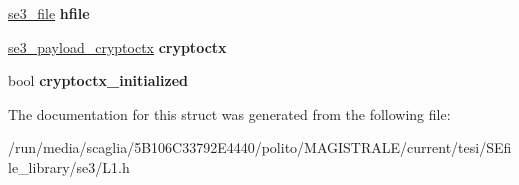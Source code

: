 \begin{DoxyCompactItemize}
\item 
\hypertarget{structse3__session___a9ed3dacbd53aad1de2b90e9da5aeea1b}{\hyperlink{structse3__file}{se3\-\_\-file} {\bfseries hfile}}\label{structse3__session___a9ed3dacbd53aad1de2b90e9da5aeea1b}

\item 
\hypertarget{structse3__session___af51decff75d32eff75f3b657fca10cab}{\hyperlink{structse3__payload__cryptoctx__}{se3\-\_\-payload\-\_\-cryptoctx} {\bfseries cryptoctx}}\label{structse3__session___af51decff75d32eff75f3b657fca10cab}

\item 
\hypertarget{structse3__session___ad89a3ebfb1c85fe112dd348cf8fbb2ac}{bool {\bfseries cryptoctx\-\_\-initialized}}\label{structse3__session___ad89a3ebfb1c85fe112dd348cf8fbb2ac}

\end{DoxyCompactItemize}


The documentation for this struct was generated from the following file\-:\begin{DoxyCompactItemize}
\item 
/run/media/scaglia/5\-B106\-C33792\-E4440/polito/\-M\-A\-G\-I\-S\-T\-R\-A\-L\-E/current/tesi/\-S\-Efile\-\_\-library/se3/L1.\-h\end{DoxyCompactItemize}
